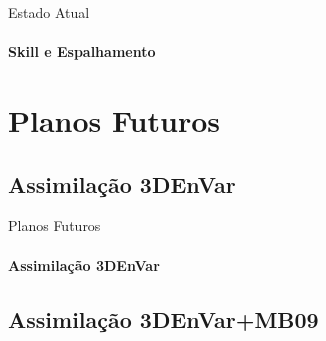 \documentclass[10pt,aspectratio=169]{beamer}
\begin{document}
\begin{frame}{Estado Atual}
\framesubtitle{Skill e Espalhamento}
  \begin{figure}[H]
    \centering
      \pause
      \caption{}
  \end{figure}
\end{frame}

\section{Planos Futuros}

\subsection{Assimilação 3DEnVar}

\begin{frame}{Planos Futuros}
\framesubtitle{Assimilação 3DEnVar}
  \vspace{-0.75em}
  \begin{figure}[t]
    \centering
    
  \end{figure}
\end{frame}

\subsection{Assimilação 3DEnVar+MB09}
\end{document}
